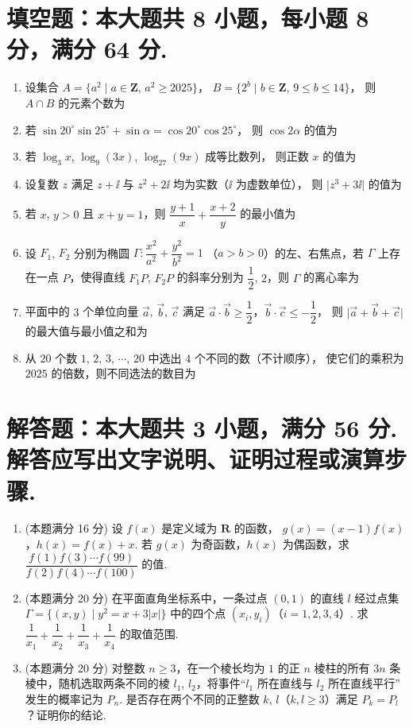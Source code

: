 \documentclass{chsmc}
\begin{document}
\section{填空题：本大题共 8 小题，每小题 8 分，满分 64 分.}

\begin{enumerate}
	\item 设集合 $A = \{a^2 \mid a \in \mathbf{Z},\, a^2 \geqslant 2025\}$，
		$B = \{2^b \mid b \in \mathbf{Z},\, 9 \leqslant b \leqslant 14\}$，
		则 $A \cap B$ 的元素个数为 \blankline
	\item 若 $\sin 20^\circ \sin 25^\circ + \sin \alpha = \cos 20^\circ \cos 25^\circ$，
		则 $\cos 2\alpha$ 的值为 \blankline
	\item 若 $\log_3 x$, $\log_9(3x)$, $\log_{27}(9x)$ 成等比数列，
		则正数 $x$ 的值为 \blankline
	\item 设复数 $z$ 满足 $z+\ii$ 与 $z^2+2\ii$ 均为实数（$\ii$ 为虚数单位），
		则 $\bigl|z^3+3\ii\bigr|$ 的值为 \blankline
	\item 若 $x$, $y > 0$ 且 $x+y=1$，则 $\dfrac{y+1}{x} + \dfrac{x+2}{y}$ 的最小值为 \blankline
	\item 设 $F_1$, $F_2$ 分别为椭圆 $\Gamma\colon \dfrac{x^2}{a^2} + \dfrac{y^2}{b^2} = 1$
		（$a>b>0$）的左、右焦点，若 $\Gamma$ 上存在一点 $P$，使得直线 $F_1P$, $F_2P$
		的斜率分别为 $\dfrac{1}{2}$, $2$，则 $\Gamma$ 的离心率为 \blankline
	\item 平面中的 $3$ 个单位向量 $\vec{a}$, $\vec{b}$, $\vec{c}$ 满足
		$\vec{a}\cdot\vec{b} \geqslant \dfrac{1}{2}$，$\vec{b}\cdot\vec{c} \leqslant -\dfrac{1}{2}$，
		则 $\bigl|\vec{a}+\vec{b}+\vec{c}\bigr|$ 的最大值与最小值之和为 \blankline
	\item 从 $20$ 个数 $1$, $2$, $3$, $\cdots$, $20$ 中选出 $4$ 个不同的数（不计顺序），
		使它们的乘积为 $2025$ 的倍数，则不同选法的数目为 \blankline
\end{enumerate}

\section{解答题：本大题共 3 小题，满分 56 分. 解答应写出文字说明、证明过程或演算步骤.}

\begin{enumerate}[resume]
	\item (本题满分 16 分) 设 $f(x)$ 是定义域为 $\mathbf{R}$ 的函数，
		$g(x) = (x-1)f(x)$，$h(x) = f(x) + x$.
		若 $g(x)$ 为奇函数，$h(x)$ 为偶函数，求
		$\dfrac{f(1)f(3)\cdots f(99)}{f(2)f(4)\cdots f(100)}$ 的值.
	\item (本题满分 20 分) 在平面直角坐标系中，一条过点 $(0,1)$ 的直线 $l$ 经过点集
		$\Gamma = \{(x,y)\mid y^2 = x + 3|x|\}$ 中的四个点 $(x_i,y_i)$（$i = 1,2,3,4$）.
		求 $\dfrac{1}{x_1} + \dfrac{1}{x_2} + \dfrac{1}{x_3} + \dfrac{1}{x_4}$ 的取值范围.
	\item (本题满分 20 分) 对整数 $n \geqslant 3$，在一个棱长均为 $1$ 的正 $n$ 棱柱的所有 $3n$
		条棱中，随机选取两条不同的棱 $l_1$, $l_2$，将事件“$l_1$ 所在直线与 $l_2$ 所在直线平行”
		发生的概率记为 $P_n$.
		是否存在两个不同的正整数 $k$, $l$（$k,l \geqslant 3$）满足 $P_k = P_l$？证明你的结论.
\end{enumerate}
\end{document}
